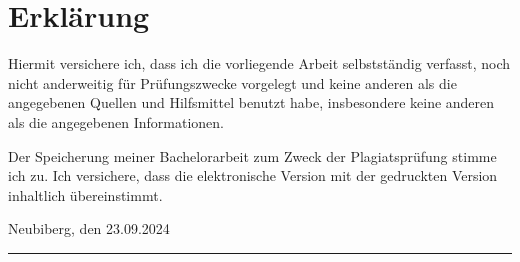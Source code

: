 \newpage
\chapter*{Erklärung}


\vspace{1cm}

Hiermit versichere ich, dass ich die vorliegende Arbeit selbstständig verfasst, noch nicht anderweitig für Prüfungszwecke vorgelegt und keine anderen als die angegebenen Quellen und Hilfsmittel benutzt habe, insbesondere keine anderen als die angegebenen Informationen. \\
\hspace{\fill}
\vspace{0.5cm}

Der Speicherung meiner Bachelorarbeit zum Zweck der Plagiatsprüfung stimme ich zu. Ich versichere, dass die elektronische Version mit der gedruckten Version inhaltlich übereinstimmt.\\
\hspace{\fill}
\vspace{0.6cm}

Neubiberg, den 23.09.2024 
\hspace{\fill}
\newline\hspace{\fill}\newline\hspace{\fill}\newline\hspace{\fill}\newline\hspace{\fill}
\rule{0.3\textwidth}{0.4pt} \newline
\theAuthor
\hspace{\fill}
\cleardoublepage